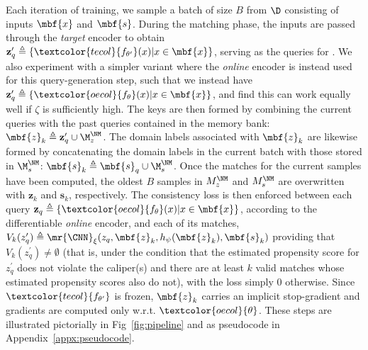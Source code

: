Each iteration of training, we sample a batch of size $B$ from $\D$ consisting of inputs $\mbf{x}$
and $\mbf{s}$.
%
During the matching phase, the inputs are passed through the \emph{target} encoder to obtain
$\mathbf{z}_q^\prime \triangleq \{ \textcolor{tecol}{f_{\theta^\prime} } (x) | x \in \mbf{x}\}$,
serving as the queries for \CNN.
%
We also experiment with a simpler variant where the \emph{online} encoder is instead used for this
query-generation step, such that we instead have $\mathbf{z}_q^\prime \triangleq
\{\textcolor{oecol}{f_{\theta}}(x) | x \in \mbf{x}\}$, and find this can work equally well if
$\zeta$ is sufficiently high.
%
The keys are then formed by combining the current queries with the past queries contained in the
memory bank: $\mbf{z}_k\triangleq \mathbf{z}_q^\prime \cup \M^{\NM}_z$.
%
The domain labels associated with $\mbf{z}_k$ are likewise formed by concatenating the domain
labels in the current batch with those stored in $\M^{\NM}_s$: $\mbf{s}_k \triangleq \mbf{s}_q \cup
\M^{\NM}_s$.
%
Once the matches for the current samples have been computed, the oldest $B$ samples in $M^{\NM}_z$
and $M^{\NM}_s$ are overwritten with $\mathbf{z}_k$ and $\mathbf{s}_k$, respectively.
%
The consistency loss is then enforced between each query $\mathbf{z}_q \triangleq \{
  \textcolor{oecol}{f_{\theta}}(x) |
x \in \mbf{x}\} $, according to the differentiable \emph{online} encoder, and each of its matches,
$V_k(z_q^\prime) \triangleq \mr{\CNN}_\xi(z_q, \mbf{z}_k, h_\psi(\mbf{z}_k), \mbf{s}_k)$ providing
that $V_k(z_q^\prime) \neq \emptyset$ (that is, under the condition that the estimated propensity
score for $z_q^\prime$ does not violate the caliper(s) and there are at least $k$ valid matches
whose estimated propensity scores also do not), with the loss simply $0$ otherwise.
%
Since $\textcolor{tecol}{ f_{\theta^\prime} }$ is frozen, $\mbf{z}_k$ carries an implicit stop-gradient and gradients
are computed only w.r.t. $\textcolor{oecol}{ \theta}$.
These steps are illustrated pictorially in Fig~\ref{fig:pipeline} and as pseudocode in
Appendix~\ref{appx:pseudocode}.


